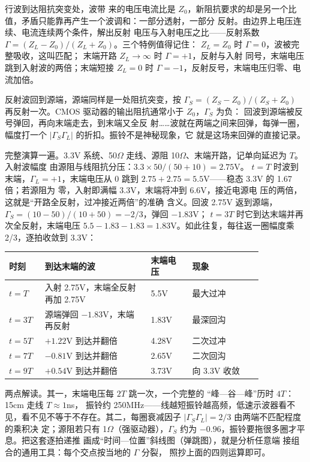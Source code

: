 行波到达阻抗突变处，波带
来的电压电流比是 $Z_0$，新阻抗要求的却是另一个比
值，矛盾只能靠再产生一个波调和：一部分透射，一部分
反射。由边界上电压连续、电流连续两个条件，解出反射
电压与入射电压之比——反射系数
$\Gamma=(Z_L-Z_0)/(Z_L+Z_0)$。三个特例值得记住：
$Z_L=Z_0$ 时 $\Gamma=0$，波被完整吸收，这叫匹配；
末端开路 $Z_L\to\infty$ 时 $\Gamma=+1$，反射与入射
同号，末端电压跳到入射波的两倍；末端短接 $Z_L=0$
时 $\Gamma=-1$，反射反号，末端电压归零、电流加倍。

反射波回到源端，源端同样是一处阻抗突变，按
$\Gamma_S=(Z_S-Z_0)/(Z_S+Z_0)$ 再反射一次。CMOS
驱动器的输出阻抗通常小于 $Z_0$，$\Gamma_S$ 为负：
回波到源端被反号弹回，再向末端走去，到末端又全反
射……波就在两端之间来回弹，每弹一圈，幅度打一个
$|\Gamma_S\Gamma_L|$ 的折扣。振铃不是神秘现象，它
就是这场来回弹的直接记录。

完整演算一遍。3.3V 系统、50$\Omega$ 走线、源阻
10$\Omega$、末端开路，记单向延迟为 $T$。入射波幅度
由源阻与线阻抗分压：$3.3\times50/(50+10)=2.75$V。
$t=T$ 时波到末端，$\Gamma_L=+1$，末端电压从 0 跳到
$2.75+2.75=5.5$V——稳态 3.3V 的 1.67 倍；若源阻为
零，入射即满幅 3.3V，末端将冲到 6.6V，接近电源电
压的两倍，这就是“开路全反射，过冲接近两倍”的准确
含义。回波 2.75V 返到源端，
$\Gamma_S=(10-50)/(10+50)=-2/3$，弹回 $-1.83$V；
$t=3T$ 时它到达末端并再次全反射，末端电压
$5.5-1.83-1.83=1.83$V。如此往复，每往返一圈幅度乘
2/3，逐拍收敛到 3.3V：

\begin{longtable}{L{0.1\linewidth}L{0.36\linewidth}L{0.14\linewidth}L{0.24\linewidth}}
\toprule
时刻 & 到达末端的波 & 末端电压 & 现象 \\
\midrule
$t=T$ & 入射 2.75V，末端全反射再加 2.75V & 5.5V & 最大过冲 \\\tablerowrule
$t=3T$ & 源端弹回 $-1.83$V，末端再反射 & 1.83V & 最深回沟 \\\tablerowrule
$t=5T$ & $+1.22$V 到达并翻倍 & 4.28V & 二次过冲 \\\tablerowrule
$t=7T$ & $-0.81$V 到达并翻倍 & 2.65V & 二次回沟 \\\tablerowrule
$t=9T$ & $+0.54$V 到达并翻倍 & 3.73V & 向 3.3V 收敛 \\
\bottomrule
\end{longtable}

两点解读。其一，末端电压每 $2T$ 跳一次，一个完整的
“峰—谷—峰”历时 $4T$：15cm 走线 $T\approx1$ns，
振铃约 250MHz——线越短振铃越高频，低速示波器看不
见，看不见不等于不存在。其二，每圈衰减因子
$|\Gamma_S\Gamma_L|=2/3$ 由两端不匹配程度的乘积决
定；源阻若只有 1$\Omega$（强驱动器），$\Gamma_S$
约为 $-0.96$，振铃要拖很多圈才平息。把这套逐拍递推
画成“时间—位置”斜线图（弹跳图），就是分析任意端
接组合的通用工具：每个交点按当地的 $\Gamma$ 分裂，
照抄上面的四则运算即可。

